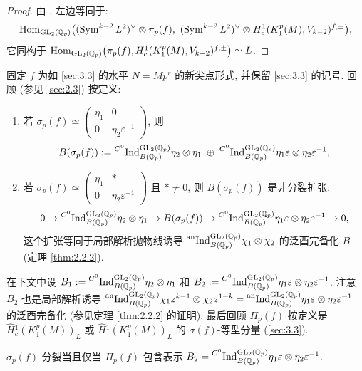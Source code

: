 \begin{proof}
由 \cite[\S4.3]{ref:24}, 左边等同于:
\[
\operatorname{Hom}_{\mathrm{GL}_2(\mathbb{Q}_p)}\bigl((\operatorname{Sym}^{k-2}L^{2})^{\vee} \otimes \pi_p(f),\ (\operatorname{Sym}^{k-2}L^{2})^{\vee} \otimes H_{c}^{1}(K_1^{p}(M),V_{k-2})^{f,\pm}\bigr),
\]
它同构于 $\operatorname{Hom}_{\mathrm{GL}_2(\mathbb{Q}_p)}\bigl(\pi_p(f),H_{c}^{1}(K_1^{p}(M),V_{k-2})^{f,\pm}\bigr) \simeq L$.
\end{proof}

固定 $f$ 为如 \ref{sec:3.3} 的水平 $N = Mp^{r}$ 的新尖点形式, 并保留 \ref{sec:3.3} 的记号.
回顾 (参见 \ref{sec:2.3}) 按定义:
\begin{enumerate}
\item[(i)] 若 $\sigma_p(f) \simeq \begin{pmatrix} \eta_1 & 0 \\ 0 & \eta_2\varepsilon^{-1} \end{pmatrix}$, 则
\[
B(\sigma_p(f)) := \prescript{C^{0}}{}{\mathrm{Ind}}_{B(\mathbb{Q}_p)}^{\mathrm{GL}_2(\mathbb{Q}_p)} \eta_2 \otimes \eta_1 \;\oplus\; \prescript{C^{0}}{}{\mathrm{Ind}}_{B(\mathbb{Q}_p)}^{\mathrm{GL}_2(\mathbb{Q}_p)} \eta_1\varepsilon \otimes \eta_2\varepsilon^{-1},
\]
\item[(ii)] 若 $\sigma_p(f) \simeq \begin{pmatrix} \eta_1 & * \\ 0 & \eta_2\varepsilon^{-1} \end{pmatrix}$ 且 $* \neq 0$, 则 $B(\sigma_p(f))$ 是非分裂扩张:
\[
0 \to \prescript{C^{0}}{}{\mathrm{Ind}}_{B(\mathbb{Q}_p)}^{\mathrm{GL}_2(\mathbb{Q}_p)} \eta_2 \otimes \eta_1 \to B(\sigma_p(f)) \to \prescript{C^{0}}{}{\mathrm{Ind}}_{B(\mathbb{Q}_p)}^{\mathrm{GL}_2(\mathbb{Q}_p)} \eta_1\varepsilon \otimes \eta_2\varepsilon^{-1} \to 0,
\]
这个扩张等同于局部解析抛物线诱导 $\prescript{\mathrm{an}}{}{\mathrm{Ind}}_{B(\mathbb{Q}_p)}^{\mathrm{GL}_2(\mathbb{Q}_p)} \chi_1 \otimes \chi_2$ 的泛酉完备化 $B$ (定理 \ref{thm:2.2.2}).
\end{enumerate}
在下文中设 $B_1 := \prescript{C^{0}}{}{\mathrm{Ind}}_{B(\mathbb{Q}_p)}^{\mathrm{GL}_2(\mathbb{Q}_p)} \eta_2 \otimes \eta_1$ 和 $B_2 := \prescript{C^{0}}{}{\mathrm{Ind}}_{B(\mathbb{Q}_p)}^{\mathrm{GL}_2(\mathbb{Q}_p)} \eta_1\varepsilon \otimes \eta_2\varepsilon^{-1}$.
注意 $B_2$ 也是局部解析诱导 $\prescript{\mathrm{an}}{}{\mathrm{Ind}}_{B(\mathbb{Q}_p)}^{\mathrm{GL}_2(\mathbb{Q}_p)} \chi_1z^{k-1} \otimes \chi_2z^{1-k} = \prescript{\mathrm{an}}{}{\mathrm{Ind}}_{B(\mathbb{Q}_p)}^{\mathrm{GL}_2(\mathbb{Q}_p)} \eta_1\varepsilon \otimes \eta_2\varepsilon^{-1}$ 的泛酉完备化 (参见定理 \ref{thm:2.2.2} 的证明).
最后回顾 $\Pi_p(f)$ 按定义是 $\widehat{H}{}_{c}^{1}(K_1^{p}(M))_L$ 或 $\widehat{H}{}^{1}(K_1^{p}(M))_L$ 的 $\sigma(f)$-等型分量 (\ref{sec:3.3}).

\begin{theorem}\label{thm:5.7.2}
$\sigma_p(f)$ 分裂当且仅当 $\Pi_p(f)$ 包含表示 $B_2 = \prescript{C^{0}}{}{\mathrm{Ind}}_{B(\mathbb{Q}_p)}^{\mathrm{GL}_2(\mathbb{Q}_p)} \eta_1\varepsilon \otimes \eta_2\varepsilon^{-1}$.
\end{theorem}

